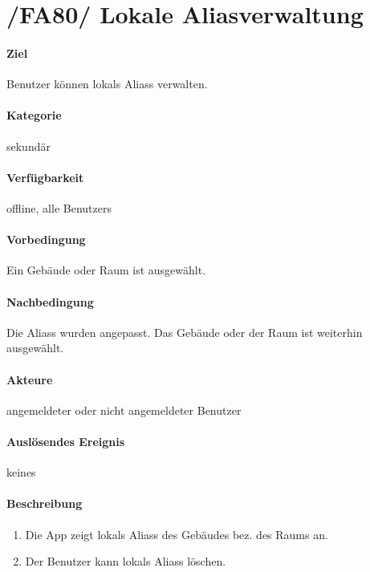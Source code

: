\section{/FA80/ Lokale Aliasverwaltung}
\label{Lokale_Aliasverwaltung}
\label{/FA80/}
\paragraph{Ziel}
\Gls{Benutzer} können \glspl{lokal} \Glspl{Alias} verwalten.
\paragraph{Kategorie}
sekundär
\paragraph{Verfügbarkeit}
offline, alle \Glspl{Benutzer}
\paragraph{Vorbedingung}
Ein Gebäude oder Raum ist ausgewählt.
\paragraph{Nachbedingung}
Die \Glspl{Alias} wurden angepasst. Das Gebäude oder der Raum ist weiterhin ausgewählt.
\paragraph{Akteure}
angemeldeter oder nicht angemeldeter \Gls{Benutzer}
\paragraph{Auslösendes Ereignis} keines
\paragraph{Beschreibung}
\begin{enumerate}
      \item Die App zeigt \glspl{lokal} \Glspl{Alias} des Gebäudes bez. des Raums an.
      \item Der \Gls{Benutzer} kann \glspl{lokal} \Glspl{Alias} löschen.
\end{enumerate}